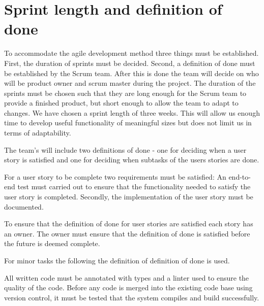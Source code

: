 \section{Sprint length and definition of done}
To accommodate the agile development method three things must be established.
First, the duration of sprints must be decided.
Second, a definition of done must be established by the Scrum team.
After this is done the team will decide on who will be product owner and scrum master during the project. 
The duration of the sprints must be chosen such that they are long enough for the Scrum team to provide a finished product, but short enough to allow the team to adapt to changes\cite{scrumguide}. 
We have chosen a sprint length of three weeks.
This will allow us enough time to develop useful functionality of meaningful sizes but does not limit us in terms of adaptability.

The team's will include two definitions of done - one for deciding when a user story is satisfied and one for deciding when subtasks of the users stories are done.
\begin{dod}
    For a user story to be complete two requirements must be satisfied: An end-to-end test must carried out to ensure that the functionality needed to satisfy the user story is completed. Secondly, the implementation of the user story must be documented. 
\end{dod}
To ensure that the definition of done for user stories are satisfied each story has an owner. 
The owner must ensure that the definition of done is satisfied before the future is deemed complete.

For minor tasks the following the definition of definition of done is used. 
\begin{dod}
    All written code must be annotated with types and a linter used to ensure the quality of the code.
    Before any code is merged into the existing code base using version control, it must be tested that the system compiles and build successfully.  
\end{dod}

